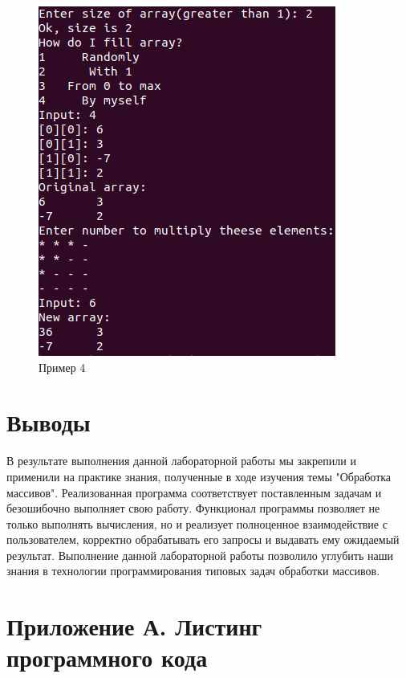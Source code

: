 \documentclass[12pt,a4paper]{article}%
\begin{document}
	\begin{figure}[hpt!]
		\centering
		\includegraphics[width=0.6\linewidth]{t4}
		\caption{Пример 4}
		\label{t4}
	\end{figure}
	
	\newpage
	\section*{Выводы}
	
	В результате выполнения данной лабораторной работы мы закрепили и применили на практике знания, полученные в ходе изучения темы "Обработка массивов". Реализованная программа соответствует поставленным задачам и безошибочно выполняет свою работу. Функционал программы позволяет не только выполнять вычисления, но и реализует полноценное взаимодействие с пользователем, корректно обрабатывать его запросы и выдавать ему ожидаемый результат. Выполнение данной лабораторной работы позволило углубить наши знания в технологии программирования типовых задач обработки массивов.
	
	\newpage
	\section*{Приложение А. Листинг программного кода}
	
\end{document}
